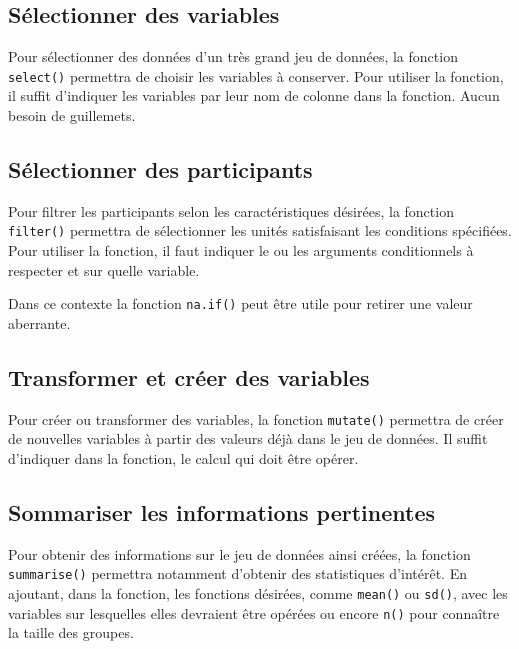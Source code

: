 \documentclass[
]{book}
\begin{document}
\hypertarget{suxe9lectionner-des-variables}{%
\subsection{Sélectionner des variables}\label{suxe9lectionner-des-variables}}

Pour sélectionner des données d'un très grand jeu de données, la fonction \texttt{select()} permettra de choisir les variables à conserver. Pour utiliser la fonction, il suffit d'indiquer les variables par leur nom de colonne dans la fonction. Aucun besoin de guillemets.

\hypertarget{suxe9lectionner-des-participants}{%
\subsection{Sélectionner des participants}\label{suxe9lectionner-des-participants}}

Pour filtrer les participants selon les caractéristiques désirées, la fonction \texttt{filter()} permettra de sélectionner les unités satisfaisant les conditions spécifiées. Pour utiliser la fonction, il faut indiquer le ou les arguments conditionnels à respecter et sur quelle variable.

Dans ce contexte la fonction \texttt{na.if()} peut être utile pour retirer une valeur aberrante.

\hypertarget{transformer-et-cruxe9er-des-variables}{%
\subsection{Transformer et créer des variables}\label{transformer-et-cruxe9er-des-variables}}

Pour créer ou transformer des variables, la fonction \texttt{mutate()} permettra de créer de nouvelles variables à partir des valeurs déjà dans le jeu de données. Il suffit d'indiquer dans la fonction, le calcul qui doit être opérer.

\hypertarget{sommariser-les-informations-pertinentes}{%
\subsection{Sommariser les informations pertinentes}\label{sommariser-les-informations-pertinentes}}

Pour obtenir des informations sur le jeu de données ainsi créées, la fonction \texttt{summarise()} permettra notamment d'obtenir des statistiques d'intérêt. En ajoutant, dans la fonction, les fonctions désirées, comme \texttt{mean()} ou \texttt{sd()}, avec les variables sur lesquelles elles devraient être opérées ou encore \texttt{n()} pour connaître la taille des groupes.
\end{document}
